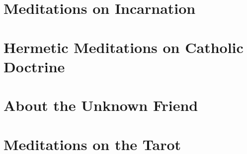 \documentclass[a4paper,12pt,twoside]{book}
\begin{document}
\chapter{Meditations on Incarnation}




\chapter{Hermetic Meditations on Catholic Doctrine}









\chapter{About the Unknown Friend}




\chapter{Meditations on the Tarot}






















\end{document}
